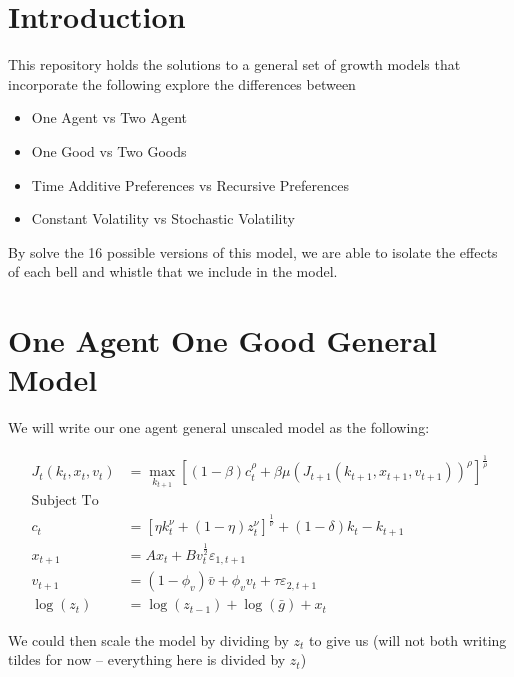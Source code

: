 \documentclass[10pt]{article}
\begin{document}
\section{Introduction}

  This repository holds the solutions to a general set of growth models that incorporate the following explore the differences between

  \begin{itemize}
    \item One Agent vs Two Agent
    \item One Good vs Two Goods
    \item Time Additive Preferences vs Recursive Preferences
    \item Constant Volatility vs Stochastic Volatility
  \end{itemize}

  By solve the 16 possible versions of this model, we are able to isolate the effects of each bell and whistle that we include in the model.

\section{One Agent One Good General Model}

  We will write our one agent general unscaled model as the following:

  \begin{align*}
    J_t(k_t, x_t, v_t) &= \max_{k_{t+1}} \left[(1 - \beta) c_t^{\rho} + \beta \mu(J_{t+1}(k_{t+1}, x_{t+1}, v_{t+1}))^{\rho} \right]^{\frac1\rho} \\
    \text{Subject To }& \\
    c_t &= \left[ \eta k_{t}^{\nu} + (1 - \eta) z_t^{\nu} \right]^{\frac1\nu} + (1 - \delta) k_t - k_{t+1} \\
    x_{t+1} &= A x_{t} + B v_t^{\frac{1}{2}} \varepsilon_{1, t+1} \\
    v_{t+1} &= (1 - \phi_v) \bar{v} + \phi_v v_{t} + \tau \varepsilon_{2, t+1} \\
    \log(z_t) &= \log(z_{t-1}) + \log(\bar{g}) + x_t
  \end{align*}

  We could then scale the model by dividing by $z_t$ to give us (will not both writing tildes for now -- everything here is divided by $z_t$)
\end{document}
